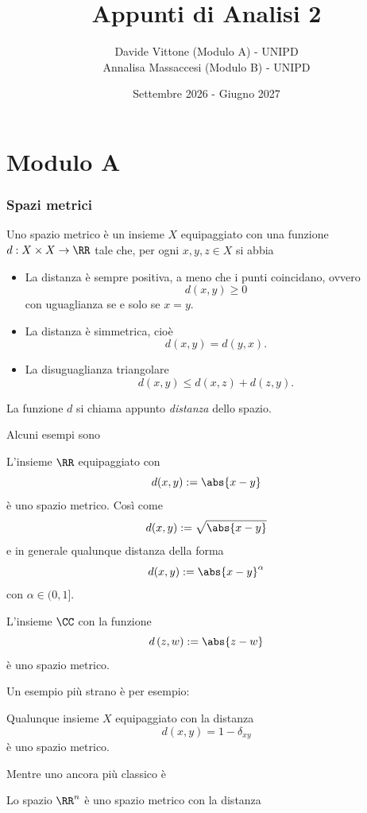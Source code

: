 \documentclass[11pt]{scrartcl}
\begin{document}
	\title{Appunti di Analisi 2}
	\subtitle{
		Davide Vittone (Modulo A) - UNIPD \\
		Annalisa Massaccesi (Modulo B) - UNIPD
	}
	\date{Settembre 2026 - Giugno 2027}
	
	\maketitle
	
	\tableofcontents
	
	\newpage
	
	\part{Modulo A}
	
	\section{Spazi metrici}
	
	\begin{definition}
		Uno spazio metrico è un insieme $X$ equipaggiato con una funzione $d:X\times X\to \RR$ tale che, per ogni $x,y,z\in X$ si abbia
		\begin{itemize}
			\item La distanza è sempre positiva, a meno che i punti coincidano, ovvero
			$$d(x,y)\ge 0$$
			con uguaglianza se e solo se $x=y$.
			\item La distanza è simmetrica, cioè
			$$d(x,y)=d(y,x).$$
			\item La disuguaglianza triangolare
			$$d(x,y)\le d(x,z)+d(z,y).$$
		\end{itemize}
		La funzione $d$ si chiama appunto \textit{distanza} dello spazio.
	\end{definition}
	Alcuni esempi sono
	\begin{example}
		L'insieme $\RR$ equipaggiato con 
		$$d(x,y):=\abs{x-y}$$
		è uno spazio metrico. Così come
		$$d(x,y):=\sqrt{\abs{x-y}}$$
		e in generale qualunque distanza della forma
		$$d(x,y):=\abs{x-y}^\alpha$$
		con $\alpha\in (0,1]$.
	\end{example}
	\begin{example}[$\CC$]
		L'insieme $\CC$ con la funzione
		$$d\left(z,w\right):=\abs{z-w}$$
		è uno spazio metrico.
	\end{example}
	Un esempio più strano è per esempio:
	\begin{example}
		Qualunque insieme $X$ equipaggiato con la distanza
		$$d(x,y)=1-\delta_{xy}$$
		è uno spazio metrico.
	\end{example}
	Mentre uno ancora più classico è
	\begin{example}
		Lo spazio $\RR^n$ è uno spazio metrico con la distanza
		
	\end{example}
	
\end{document}
